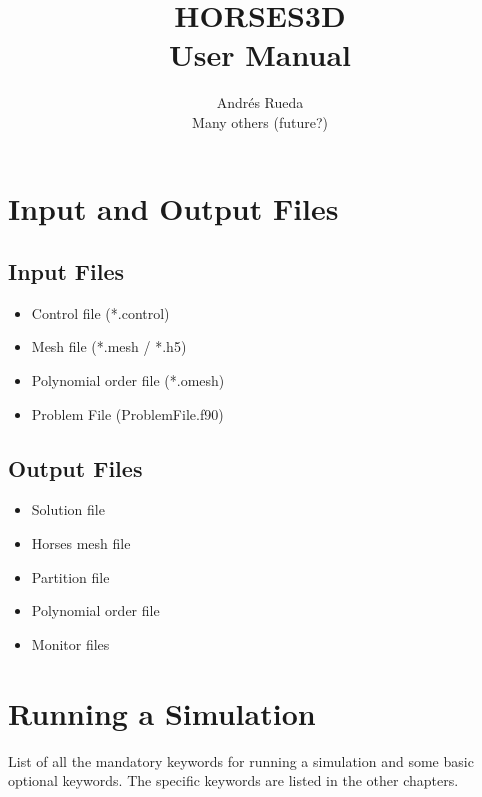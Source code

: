 \documentclass[a4paper,10pt]{report}
\title{\textbf{HORSES3D \\ User Manual}}
\author{Andrés Rueda \\ Many others (future?)}
\begin{document}
\lstset{language=C++}

\maketitle

\tableofcontents

\chapter{Input and Output Files}

\section{Input Files}
\begin{itemize}
\item Control file (*.control)
\item Mesh file (*.mesh / *.h5)
\item Polynomial order file (*.omesh)
\item Problem File (ProblemFile.f90)
\end{itemize}

\section{Output Files}
\begin{itemize}
\item Solution file
\item Horses mesh file
\item Partition file
\item Polynomial order file
\item Monitor files
\end{itemize}

\chapter{Running a Simulation}
List of all the mandatory keywords for running a simulation and some basic optional keywords. The specific keywords are listed in the other chapters.
\end{document}
